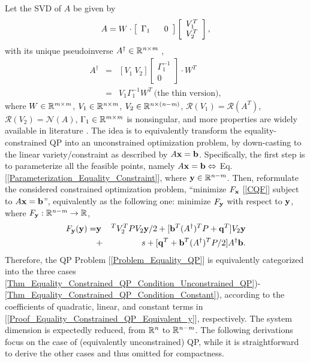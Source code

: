 \documentclass[9pt,twocolumn,twoside,lineno]{pnas-new-1}
\newcommand{\beq}{\begin{eqnarray}}
\newcommand{\eeq}{\end{eqnarray}}
\newcommand{\bfb}{{\bf b}}
\newcommand{\bfx}{{\bf x}}
\newcommand{\bfq}{{\bf q}}
\newcommand{\bfy}{{\bf y}}
\newcommand{\real}{\mathbb{R}}
\newcommand{\calN}{{\mathcal N}}
\newcommand{\calR}{{\mathcal R}}
\newcommand{\itm}{{\it m}}
\newcommand{\itn}{{\it n}}
\theoremstyle{remark}
\begin{document}
Let the SVD of $A$ be given by
\beq
A=W\cdot\left[ \begin{array}{cc} \Gamma_1~~ & 0 \end{array}\right]\left[ \def\arraystretch{1}\begin{array}{c} V_1^T\\V_2^T\end{array}\right],\nonumber
\eeq
with its unique pseudoinverse $A^\dagger\in\real^{\itn\times\itm}$ \citep{GoVa:13},
\noindent\beq
A^\dagger&=&[V_1~V_2]\left[ \begin{array}{c} \Gamma_1^{-1}\\ 0 \end{array}\right]\cdot W^T\nonumber\\
&=&V_1\Gamma_1^{-1}W^T~\mbox{(the thin version)},
\label{App_Proof_Equality_Constrained_QP_A_dagger}
\eeq
where $W\in\real^{\itm\times\itm}$, $V_1\in\real^{\itn\times\itm}$, $V_2\in\real^{\itn\times(\itn-\itm)}$, $\calR(V_1)=\calR(A^T)$, $\calR(V_2)=\calN(A)$, $\Gamma_1\in\real^{\itm\times\itm}$ is nonsingular, and more properties are widely available in literature \citep{GoVa:13}. The idea is to equivalently transform the equality-constrained QP into an unconstrained optimization problem, by down-casting to the linear variety/constraint as described by $A\bfx=\bfb$. Specifically, the first step is to parameterize all the feasible points, namely $A\bfx=\bfb\Leftrightarrow$ Eq. [\ref{Parameterization_Equality_Constraint}], where $\bfy\in\real^{\itn-\itm}$. Then, reformulate the considered constrained optimization problem, ``minimize $F_\bfx$ [\ref{CQF}] subject to $A\bfx=\bfb$'', equivalently as the following one: minimize $F_\bfy$ with respect to $\bfy$, where $F_\bfy:\real^{\itn-\itm}\rightarrow\real$,
\beq
F_\bfy(\bfy)=&\bfy&^TV_2^TPV_2\bfy/2+[\bfb^T(A^\dagger)^TP+\bfq^T]V_2\bfy\nonumber\\&+&s+[\bfq^T+\bfb^T(A^\dagger)^TP/2]A^\dagger\bfb.
\label{Proof_Equality_Constrained_QP_Equivalent_y}
\eeq
Therefore, the QP Problem [\ref{Problem_Equality_QP}] is equivalently categorized into the three cases \ref{Thm_Equality_Constrained_QP_Condition_Unconstrained_QP})-\ref{Thm_Equality_Constrained_QP_Condition_Constant}), according to the coefficients of quadratic, linear, and constant terms in [\ref{Proof_Equality_Constrained_QP_Equivalent_y}], respectively. The system dimension is expectedly reduced, from $\real^\itn$ to $\real^{\itn-\itm}$. The following derivations focus on the case of (equivalently unconstrained) QP, while it is straightforward to derive the other cases and thus omitted for compactness.
\end{document}
